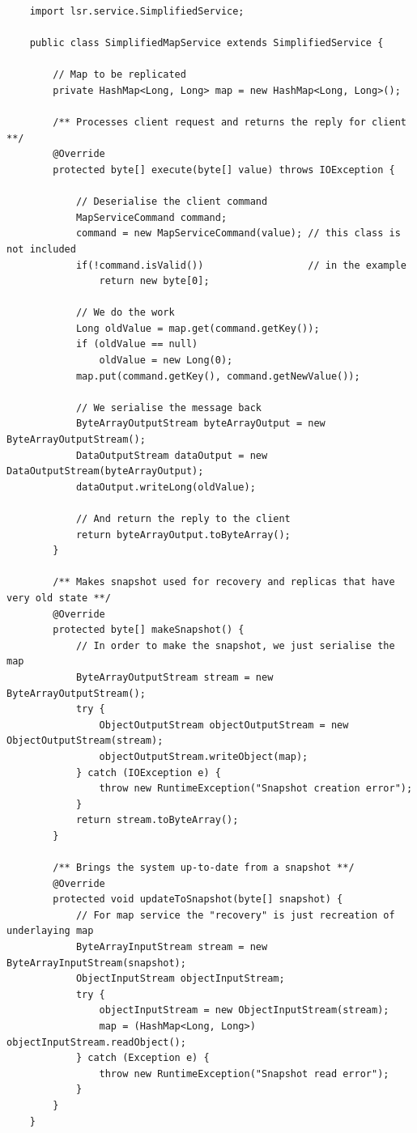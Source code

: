 \lstset{
language=Java,
basicstyle=\footnotesize\ttfamily,
tabsize=2,
breaklines=true,
breakatwhitespace=false,
lineskip=-0.5em
}

\begin{lstlisting}
    import lsr.service.SimplifiedService;

    public class SimplifiedMapService extends SimplifiedService {

        // Map to be replicated
        private HashMap<Long, Long> map = new HashMap<Long, Long>();

        /** Processes client request and returns the reply for client **/
        @Override
        protected byte[] execute(byte[] value) throws IOException {

            // Deserialise the client command
            MapServiceCommand command;
            command = new MapServiceCommand(value); // this class is not included
            if(!command.isValid())                  // in the example
                return new byte[0];

            // We do the work
            Long oldValue = map.get(command.getKey());
            if (oldValue == null)
                oldValue = new Long(0);
            map.put(command.getKey(), command.getNewValue());

            // We serialise the message back
            ByteArrayOutputStream byteArrayOutput = new ByteArrayOutputStream();
            DataOutputStream dataOutput = new DataOutputStream(byteArrayOutput);
            dataOutput.writeLong(oldValue);

            // And return the reply to the client
            return byteArrayOutput.toByteArray();
        }

        /** Makes snapshot used for recovery and replicas that have very old state **/
        @Override
        protected byte[] makeSnapshot() {
            // In order to make the snapshot, we just serialise the map
            ByteArrayOutputStream stream = new ByteArrayOutputStream();
            try {
                ObjectOutputStream objectOutputStream = new ObjectOutputStream(stream);
                objectOutputStream.writeObject(map);
            } catch (IOException e) {
                throw new RuntimeException("Snapshot creation error");
            }
            return stream.toByteArray();
        }

        /** Brings the system up-to-date from a snapshot **/
        @Override
        protected void updateToSnapshot(byte[] snapshot) {
            // For map service the "recovery" is just recreation of underlaying map
            ByteArrayInputStream stream = new ByteArrayInputStream(snapshot);
            ObjectInputStream objectInputStream;
            try {
                objectInputStream = new ObjectInputStream(stream);
                map = (HashMap<Long, Long>) objectInputStream.readObject();
            } catch (Exception e) {
                throw new RuntimeException("Snapshot read error");
            }
        }
    }
\end{lstlisting}

